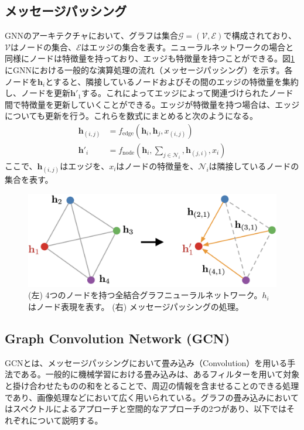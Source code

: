 \subsection{メッセージパッシング}
GNNのアーキテクチャにおいて、グラフは集合$\mathcal{G} = (\mathcal{V}, \mathcal{E})$で構成されており、$\mathcal{V}$はノードの集合、$\mathcal{E}$はエッジの集合を表す。ニューラルネットワークの場合と同様にノードは特徴量を持っており、エッジも特徴量を持つことができる。図\ref{messagepass}にGNNにおける一般的な演算処理の流れ（メッセージパッシング）を示す。各ノードを$\bm{h}_i$とすると、隣接しているノードおよびその間のエッジの特徴量を集約し、ノードを更新$\bm{h}'_1$する。これによってエッジによって関連づけられたノード間で特徴量を更新していくことができる。エッジが特徴量を持つ場合は、エッジについても更新を行う。これらを数式にまとめると次のようになる。
\begin{align}
\bm{h}_{(i,j)} &= f_{\mathrm{edge}}(\bm{h}_i, \bm{h}_j, x_{(i, j)})\\
\bm{h}'_i &= f_{\mathrm{node}}(\bm{h}_i, \sum_{j\in \mathcal{N}_i}, \bm{h}_{(j, i)}, x_i)
\label{gnnm}
\end{align}
ここで、$\bm{h}_{(i,j)}$はエッジを、$x_i$はノードの特徴量を、$\mathcal{N}_i$は隣接しているノードの集合を表す。
\begin{figure}[H]
	\begin{center}
 \includegraphics[keepaspectratio, scale=0.25]
 	{Figure/Deeplearning/messagepassing.png}
 		\caption[メッセージパッシング]{ (左) 4つのノードを持つ全結合グラフニューラルネットワーク。$h_i$はノード表現を表す。 (右) メッセージパッシングの処理。~\cite{gnnreview}}
 		\label{messagepass}
	\end{center}
\end{figure}
\subsection{Graph Convolution Network (GCN)}
GCNとは、メッセージパッシングにおいて畳み込み（Convolution）を用いる手法である。一般的に機械学習における畳み込みは、あるフィルターを用いて対象と掛け合わせたものの和をとることで、周辺の情報を含ませることのできる処理であり、画像処理などにおいて広く用いられている。グラフの畳み込みにおいてはスペクトルによるアプローチと空間的なアプローチの2つがあり、以下ではそれぞれについて説明する。
